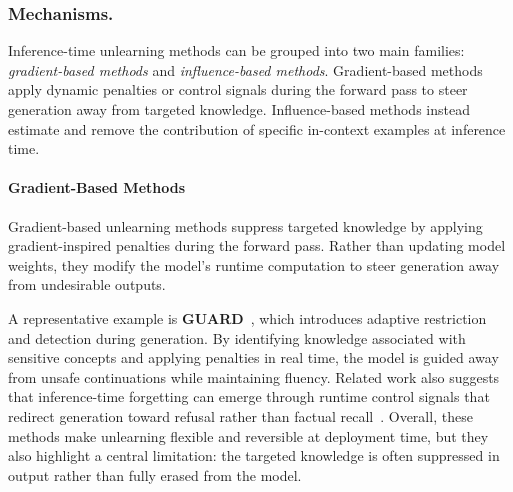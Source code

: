 \subsubsection{Mechanisms.}

Inference-time unlearning methods can be grouped into two main families: \emph{gradient-based methods} and \emph{influence-based methods}. Gradient-based methods apply dynamic penalties or control signals during the forward pass to steer generation away from targeted knowledge. Influence-based methods instead estimate and remove the contribution of specific in-context examples at inference time. 

\paragraph{Gradient-Based Methods}
Gradient-based unlearning methods suppress targeted knowledge by applying gradient-inspired penalties during the forward pass. Rather than updating model weights, they modify the model's runtime computation to steer generation away from undesirable outputs.

A representative example is \textbf{GUARD}~\citep{deng2025guard}, which introduces adaptive restriction and detection during generation. By identifying knowledge associated with sensitive concepts and applying penalties in real time, the model is guided away from unsafe continuations while maintaining fluency. Related work also suggests that inference-time forgetting can emerge through runtime control signals that redirect generation toward refusal rather than factual recall~\citep{zhang2024theft}. Overall, these methods make unlearning flexible and reversible at deployment time, but they also highlight a central limitation: the targeted knowledge is often suppressed in output rather than fully erased from the model.



